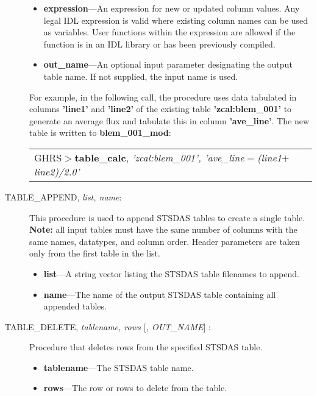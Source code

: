 \begin{description}
\begin{itemize}
\item {\bf expression}---An expression for new or updated column values.
Any legal IDL expression is valid where existing column names can be used as 
variables.  User functions within the expression are allowed if the function
is in an IDL library or has been previously compiled.

\item {\bf out\_name}---An 
optional input parameter designating the output 
table name.  If not supplied, the input name is used.

\end{itemize}

\noindent
For example, in the following call, the procedure uses data tabulated in 
columns {\bf 'line1'} and {\bf 'line2'} of the existing
table {\bf 'zcal:blem\_001'} to generate an average flux and tabulate this in
column {\bf 'ave\_line'}.  The new table is written to {\bf blem\_001\_mod}:\\

\begin{tabular}{ll}
GHRS$>${\bf table\_calc}, {\it 'zcal:blem\_001', 'ave\_line$=$(line1$+$line2)/2.0'} & \\
\end{tabular}

\item [ TABLE\_APPEND, {\it list, name}: ]  This procedure is used to 
append STSDAS tables to create a single table.  {\bf Note:} all input tables 
must have the same number of columns with the same names, datatypes, and 
column order.  Header parameters are taken only from the first table in the 
list.

\begin{itemize}
\item {\bf list}---A string vector listing the STSDAS table filenames to append.
\item {\bf name}---The name of the output STSDAS table containing all appended
tables.
\end{itemize}
%
\item [TABLE\_DELETE, {\it tablename, rows $[$, OUT\_NAME$]$} : ] 
Procedure that deletes rows from the specified STSDAS table.

\begin{itemize}

\item {\bf tablename}---The STSDAS table name.

\item {\bf rows}---The row or rows to delete from the table.


\end{itemize}
\end{description}
